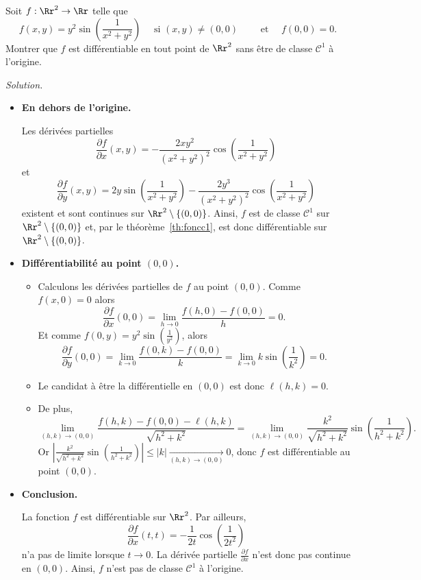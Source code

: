 \documentclass[11pt, class=report,crop=false]{standalone}
\begin{document}
\begin{exemple}
Soit $f:\Rr^2\to \Rr$ telle que
$$f(x,y)=y^2\sin \left(\frac{1}{x^2+y^2}\right)\quad \text{ si }(x,y)\neq (0,0)\qquad \text{ et }\quad f(0,0)=0.$$
Montrer que $f$ est différentiable en tout point de $\Rr^2$ sans être de classe $\mathscr{C}^1$ à l'origine.

\bigskip
\emph{Solution.}


\begin{itemize}
  \item \textbf{En dehors de l'origine.}
  
Les dérivées partielles 
$$\frac{\partial f}{\partial x}(x,y)=-\frac{2xy^2}{(x^2+y^2)^2}\cos \left(\frac{1}{x^2+y^2}\right)$$
et
$$\frac{\partial f}{\partial y}(x,y)=2y\sin \left(\frac{1}{x^2+y^2}\right)-\frac{2y^3}{(x^2+y^2)^2}\cos \left(\frac{1}{x^2+y^2}\right)$$
existent et sont continues sur $\Rr^2\setminus \{(0,0)\}$. 
Ainsi, $f$ est de classe $\mathscr{C}^1$ sur $\Rr^2\setminus \{(0,0)\}$ et, par le théorème~\ref{th:foncc1}, est donc différentiable sur $\Rr^2\setminus \{(0,0)\}$.


  \item \textbf{Différentiabilité au point $(0,0)$.} 
  \begin{itemize}
    \item Calculons les dérivées partielles de $f$ au point $(0,0)$. Comme $f(x,0)=0$ alors 
$$\frac{\partial f}{\partial x}(0,0)=\lim _{h\to 0}\frac{f(h,0)-f(0,0)}{h}=0.$$
Et comme $f(0,y) = y^2\sin \left(\frac{1}{y^2}\right)$, alors 
$$\frac{\partial f}{\partial y}(0,0) = \lim _{k\to 0}\frac{f(0,k)-f(0,0)}{k}=\lim _{k\to 0}k\sin \left(\frac{1}{k^2}\right)=0.$$
  \item Le candidat à être la différentielle en $(0,0)$ est donc $\ell(h,k) = 0$. 
  \item De plus,
$$\lim _{(h,k)\to (0,0)}\frac{f(h,k)-f(0,0)-\ell(h,k)}{\sqrt{h^2+k^2}}=\lim _{(h,k)\to (0,0)}\frac{k^2}{\sqrt{h^2+k^2}}\sin \left(\frac{1}{h^2+k^2}\right).$$
Or $\displaystyle \left|\frac{k^2}{\sqrt{h^2+k^2}}\sin \left(\frac{1}{h^2+k^2}\right)\right|\le |k| \xrightarrow[(h,k)\to(0,0)]{} 0$, donc $f$ est différentiable au point $(0,0)$.
  \end{itemize}
  \item \textbf{Conclusion.} 
  
  La fonction $f$ est différentiable sur $\Rr^2$. Par ailleurs, 
$$\frac{\partial f}{\partial x}(t,t)=-\frac{1}{2t}\cos \left(\frac{1}{2t^2}\right)$$ 
n'a pas de limite lorsque $t\to0$. La dérivée partielle $\frac{\partial f}{\partial x}$ n'est donc pas continue en $(0,0)$. Ainsi, $f$ n'est pas de classe $\mathcal{C}^1$ à l'origine.

\end{itemize}
\end{exemple}
\end{document}
